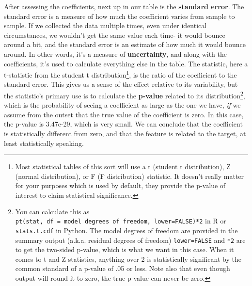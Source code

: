 \documentclass[
  letterpaper,
]{krantz}
\begin{document}
After assessing the coefficients, next up in our table is the
\textbf{standard error}. The standard error is a measure of how much the
coefficient varies from sample to sample. If we collected the data
multiple times, even under identical circumstances, we wouldn't get the
same value each time- it would bounce around a bit, and the standard
error is an estimate of how much it would bounce around. In other words,
it's a measure of \textbf{uncertainty}, and along with the coefficients,
it's used to calculate everything else in the table. The statistic, here
a t-statistic from the student t distribution\footnote{Most statistical
  tables of this sort will use a t (student t distribution), Z (normal
  distribution), or F (F distribution) statistic. It doesn't really
  matter for your purposes which is used by default, they provide the
  p-value of interest to claim statistical significance.}, is the ratio
of the coefficient to the standard error. This gives us a sense of the
effect relative to its variability, but the statistic's primary use is
to calculate the \textbf{p-value} related to its
distribution\footnote{You can calculate this as
  \texttt{pt(stat,\ df\ =\ model\ degrees\ of\ freedom,\ lower=FALSE)*2}
  in R or \texttt{stats.t.cdf} in Python. The model degrees of freedom
  are provided in the summary output (a.k.a. residual degrees of
  freedom) \texttt{lower=FALSE} and \texttt{*2} are to get the two-sided
  p-value, which is what we want in this case. When it comes to t and Z
  statistics, anything over 2 is statistically significant by the common
  standard of a p-value of .05 or less. Note also that even though
  output will round it to zero, the true p-value can never be zero.},
which is the probability of seeing a coefficient as large as the one we
have, \emph{if} we assume from the outset that the true value of the
coefficient is zero. In this case, the p-value is 3.47e-29, which is
very small. We can conclude that the coefficient is statistically
different from zero, and that the feature is related to the target, at
least statistically speaking.
\end{document}
